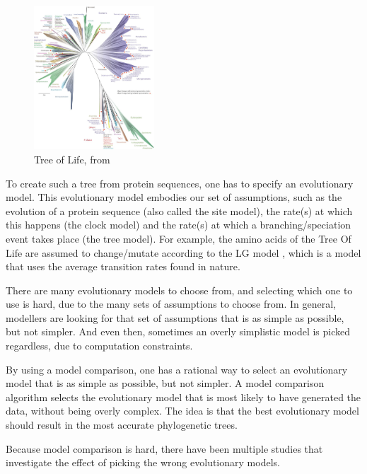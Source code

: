 \begin{figure}[H]
  \includegraphics[width=0.4\textwidth]{tree_of_life_2016.jpg}
  \caption{
    Tree of Life, from \cite{hug2016new}
 }
  \label{fig:tree_of_life}
\end{figure}

To create such a tree from protein sequences, one has to specify
an evolutionary model. This evolutionary model embodies our set of
assumptions,
such as the evolution of a protein sequence (also called the site model), 
the rate(s) at which this happens (the clock model) 
and the rate(s) at which a branching/speciation event takes 
place (the tree model). 
For example, the amino acids of the Tree Of Life are assumed to change/mutate
according to the LG model \cite{le2008improved}, 
which is a model that uses the average transition rates found in nature.

There are many evolutionary models to choose from, 
and selecting which one to use is hard, due to the many sets of assumptions
to choose from. In general, modellers are looking for that set of assumptions
that is as simple as possible, but not simpler. And even then, sometimes
an overly simplistic model is picked regardless, due to computation 
constraints. 

By using a model comparison, one has a rational way to select 
an evolutionary model that is as simple as possible, but not simpler.
A model comparison algorithm selects the evolutionary model that is
most likely to have generated the data, without being overly complex.
The idea is that the best evolutionary model should result in the
most accurate phylogenetic trees.

Because model comparison is hard, there have been multiple
studies that investigate the effect of picking the wrong
evolutionary models. 


